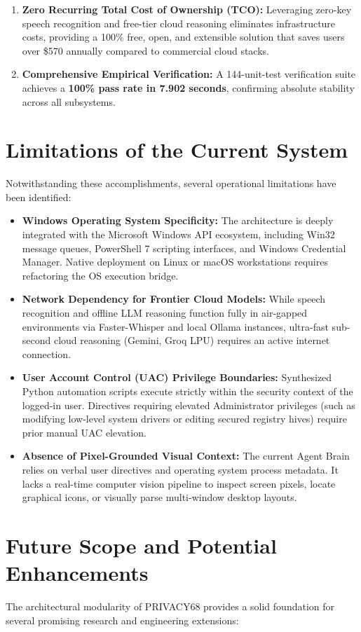 \begin{enumerate}
    \item \textbf{Zero Recurring Total Cost of Ownership (TCO):} Leveraging zero-key speech recognition and free-tier cloud reasoning eliminates infrastructure costs, providing a 100\% free, open, and extensible solution that saves users over \$570 annually compared to commercial cloud stacks.
    \item \textbf{Comprehensive Empirical Verification:} A 144-unit-test verification suite achieves a \textbf{100\% pass rate in 7.902 seconds}, confirming absolute stability across all subsystems.
\end{enumerate}

\section{Limitations of the Current System}
Notwithstanding these accomplishments, several operational limitations have been identified:
\begin{itemize}
    \item \textbf{Windows Operating System Specificity:} The architecture is deeply integrated with the Microsoft Windows API ecosystem, including Win32 message queues, PowerShell 7 scripting interfaces, and Windows Credential Manager. Native deployment on Linux or macOS workstations requires refactoring the OS execution bridge.
    \item \textbf{Network Dependency for Frontier Cloud Models:} While speech recognition and offline LLM reasoning function fully in air-gapped environments via Faster-Whisper and local Ollama instances, ultra-fast sub-second cloud reasoning (Gemini, Groq LPU) requires an active internet connection.
    \item \textbf{User Account Control (UAC) Privilege Boundaries:} Synthesized Python automation scripts execute strictly within the security context of the logged-in user. Directives requiring elevated Administrator privileges (such as modifying low-level system drivers or editing secured registry hives) require prior manual UAC elevation.
    \item \textbf{Absence of Pixel-Grounded Visual Context:} The current Agent Brain relies on verbal user directives and operating system process metadata. It lacks a real-time computer vision pipeline to inspect screen pixels, locate graphical icons, or visually parse multi-window desktop layouts.
\end{itemize}

\section{Future Scope and Potential Enhancements}
The architectural modularity of PRIVACY68 provides a solid foundation for several promising research and engineering extensions:

